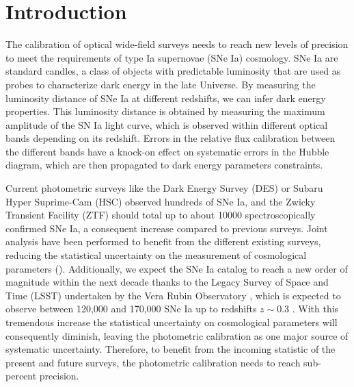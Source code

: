 \section{Introduction}

The calibration of optical wide-field surveys needs to reach new levels of precision to meet the requirements of type Ia supernovae (SNe Ia) cosmology. SNe Ia are standard candles, a class of objects with predictable luminosity that are used as probes to characterize dark energy in the late Universe. By measuring the luminosity distance of SNe Ia at different redshifts, we can infer dark energy properties. This luminosity distance is obtained by measuring the maximum amplitude of the SN Ia light curve, which is observed within different optical bands depending on its redshift. Errors in the relative flux calibration between the different bands have a knock-on effect on systematic errors in the Hubble diagram, which are then propagated to dark energy parameters constraints.

Current photometric surveys like the Dark Energy Survey (DES) \citep{Brout_2019} or Subaru Hyper Suprime-Cam (HSC) \citep{hsc_2019} observed hundreds of SNe Ia, and the Zwicky Transient Facility (ZTF) \citep{ztf_2022} should total up to about \num{10000} spectroscopically confirmed SNe Ia, a consequent increase compared to previous surveys. Joint analysis have been performed to benefit from the different existing surveys, reducing the statistical uncertainty on the measurement of cosmological parameters (\citealt{Betoule_2014,Scolnic_2018,Brout_2022,rubin2023union}). Additionally, we expect the SNe Ia catalog to reach a new order of magnitude within the next decade thanks to the Legacy Survey of Space and Time (LSST) undertaken by the Vera Rubin Observatory \citep{lsst}, which is expected to observe between 120,000 and 170,000 SNe Ia up to redshifts $z \sim 0.3$ \citep{lsst_2022}. With this tremendous increase the statistical uncertainty on cosmological parameters will consequently diminish, leaving the photometric calibration as one major source of systematic uncertainty. Therefore, to benefit from the incoming statistic of the present and future surveys, the photometric calibration needs to reach sub-percent precision.

